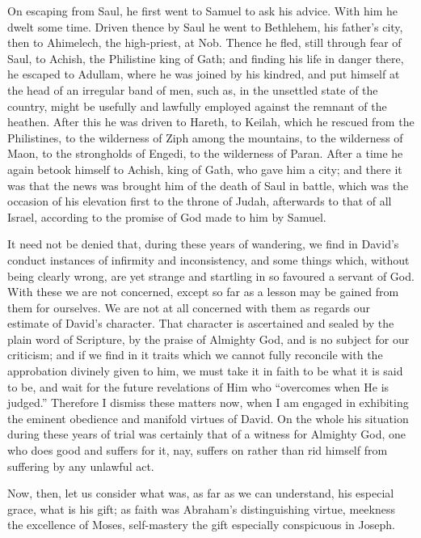 On escaping from Saul, he first went to Samuel to ask his advice.
With him he dwelt some time. Driven thence by Saul he went to
Bethlehem, his father's city, then to Ahimelech, the high-priest, at
Nob. Thence he fled, still through fear of Saul, to Achish, the
Philistine king of Gath; and finding his life in danger there, he
escaped to Adullam, where he was joined by his kindred, and put
himself at the head of an irregular band of men, such as, in the
unsettled state of the country, might be usefully and lawfully
employed against the remnant of the heathen. After this he was driven
to Hareth, to Keilah, which he rescued from the Philistines, to the
wilderness of Ziph among the mountains, to the wilderness of Maon, to
the strongholds of Engedi, to the wilderness of Paran. After a time he
again betook himself to Achish, king of Gath, who gave him a city; and
there it was that the news was brought him of the death of Saul in
battle, which was the occasion of his elevation first to the throne of
Judah, afterwards to that of all Israel, according to the promise of
God made to him by Samuel.

It need not be denied that, during these years of wandering, we
find in David's conduct instances of infirmity and inconsistency, and
some things which, without being clearly wrong, are yet strange and
startling in so favoured a servant of God. With these we are not
concerned, except so far as a lesson may be gained from them for
ourselves. We are not at all concerned with them as regards our
estimate of David's character. That character is ascertained and
sealed by the plain word of Scripture, by the praise of Almighty God,
and is no subject for our criticism; and if we find in it traits which
we cannot fully reconcile with the approbation divinely given to him,
we must take it in faith to be what it is said to be, and wait for the
future revelations of Him who ``overcomes when He is judged.''
Therefore I dismiss these matters now, when I am engaged in exhibiting
the eminent obedience and manifold virtues of David. On the whole his
situation during these years of trial was certainly that of a witness
for Almighty God, one who does good and suffers for it, nay, suffers
on rather than rid himself from suffering by any unlawful act.

Now, then, let us consider what was, as far as we can understand,
his especial grace, what is his gift; as faith was Abraham's
distinguishing virtue, meekness the excellence of Moses, self-mastery
the gift especially conspicuous in Joseph.

